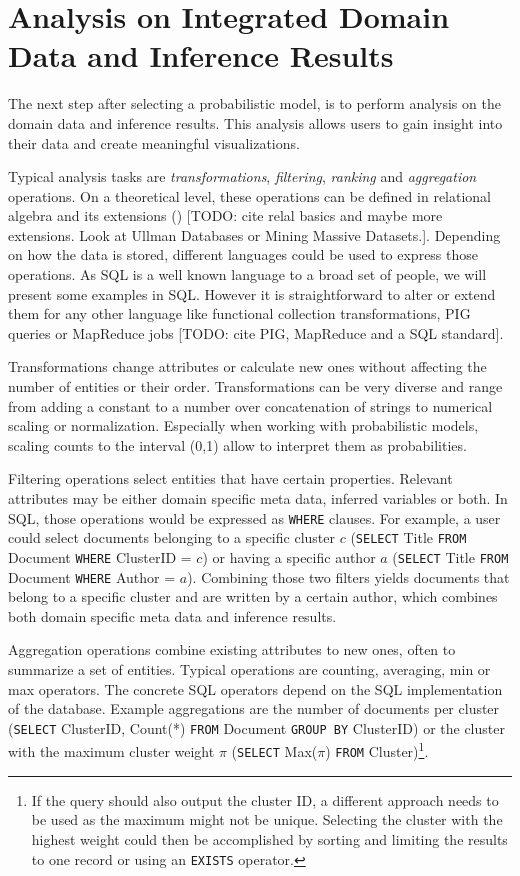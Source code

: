\section{Analysis on Integrated Domain Data and Inference Results}

The next step after selecting a probabilistic model, is to perform analysis on the domain data and inference results. This analysis allows users to gain insight into their data and create meaningful visualizations.

Typical analysis tasks are \emph{transformations}, \emph{filtering}, \emph{ranking} and \emph{aggregation} operations. On a theoretical level, these operations can be defined in relational algebra and its extensions (\cite{ozsoyouglu1987extending, klug1982equivalence}) [TODO: cite relal basics and maybe more extensions. Look at Ullman Databases or Mining Massive Datasets.]. Depending on how the data is stored, different languages could be used to express those operations. As SQL is a well known language to a broad set of people, we will present some examples in SQL. However it is straightforward to alter or extend them for any other language like functional collection transformations, PIG queries or MapReduce jobs [TODO: cite PIG, MapReduce and a SQL standard].

Transformations change attributes or calculate new ones without affecting the number of entities or their order. Transformations can be very diverse and range from adding a constant to a number over concatenation of strings to numerical scaling or normalization. Especially when working with probabilistic models, scaling counts to the interval (0,1) allow to interpret them as probabilities.

Filtering operations select entities that have certain properties. Relevant attributes may be either domain specific meta data, inferred variables or both. In SQL, those operations would be expressed as \texttt{WHERE} clauses. For example, a user could select documents belonging to a specific cluster $c$ (\texttt{SELECT} Title \texttt{FROM} Document \texttt{WHERE} ClusterID = $c$) or having a specific author $a$ (\texttt{SELECT} Title \texttt{FROM} Document \texttt{WHERE} Author = $a$). Combining those two filters yields documents that belong to a specific cluster and are written by a certain author, which combines both domain specific meta data and inference results.

Aggregation operations combine existing attributes to new ones, often to summarize a set of entities. Typical operations are counting, averaging, min or max operators. The concrete SQL operators depend on the SQL implementation of the database. Example aggregations are the number of documents per cluster (\texttt{SELECT} ClusterID, Count(*) \texttt{FROM} Document \texttt{GROUP BY} ClusterID) or the cluster with the maximum cluster weight $\pi$ (\texttt{SELECT} Max($\pi$) \texttt{FROM} Cluster)\footnote{If the query should also output the cluster ID, a different approach needs to be used as the maximum might not be unique. Selecting the cluster with the highest weight could then be accomplished by sorting and limiting the results to one record or using an \texttt{EXISTS} operator.}.

